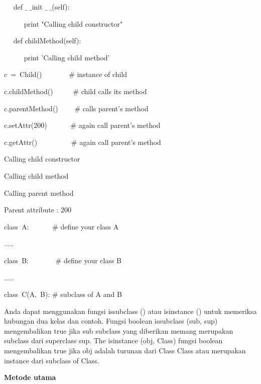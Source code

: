 \begin{12pt}
\begin{12pt}
\begin{12pt}
\begin{12pt}
\begin{12pt}
\begin{12pt}
\begin{12pt}
\begin{12pt}
\begin{12pt}
\begin{12pt}
\begin{12pt}
\begin{12pt}
\begin{12pt}
\begin{12pt}
\begin{12pt}
\begin{12pt}
\begin{12pt}
\begin{12pt}
\begin{12pt}
\noindent 
~~ def  $  \_  $ $  \_  $init $  \_  $ $  \_  $(self): \par
\noindent 
~~~~~ print "Calling child constructor" \par
\vspace{12pt}
\noindent 
~~ def childMethod(self): \par
\noindent 
~~~~~ print 'Calling child method' \par
\vspace{12pt}
\noindent 
c~=~Child()~~~~~~~    $  \#  $ instance of child \par
\noindent 
c.childMethod()~~~~~  $  \#  $ child calls its method \par
\noindent 
c.parentMethod()~~~~  $  \#  $ calls parent's method \par
\noindent 
c.setAttr(200)~~~~~~  $  \#  $ again call parent's method \par
\noindent 
c.getAttr()~~~~~~~~~  $  \#  $ again call parent's method \par
\vspace{12pt}
\noindent 
Calling child constructor \par
\noindent 
Calling child method \par
\noindent 
Calling parent method \par
\noindent 
Parent attribute : 200 \par
\vspace{12pt}
\noindent 
class~A:~~~~~~   $  \#  $ define your class A \par
\noindent 
..... \par
\vspace{12pt}
\noindent 
class~B:~~~~~~~   $  \#  $ define your class B \par
\noindent 
..... \par
\vspace{12pt}
\noindent 
class~C(A,~B):    $  \#  $ subclass of A and B \par
\vspace{12pt}
Anda dapat menggunakan fungsi issubclass () atau isinstance () untuk memeriksa hubungan dua kelas dan contoh. Fungsi boolean issubclass (sub, sup) mengembalikan true jika sub subclass yang diberikan memang merupakan subclass dari superclass sup. The isinstance (obj, Class) fungsi boolean mengembalikan true jika obj adalah turunan dari Class Class atau merupakan instance dari subclass of Class. \par
\vspace{12pt}
\noindent 
{\fontsize{14pt}{14pt}\selectfont \textbf{Metode utama} \\} \par

\end{12pt}
\end{12pt}
\end{12pt}
\end{12pt}
\end{12pt}
\end{12pt}
\end{12pt}
\end{12pt}
\end{12pt}
\end{12pt}
\end{12pt}
\end{12pt}
\end{12pt}
\end{12pt}
\end{12pt}
\end{12pt}
\end{12pt}
\end{12pt}
\end{12pt}
